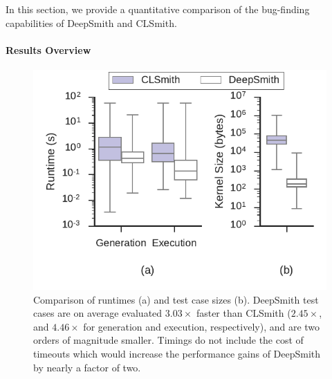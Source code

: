 In this section, we provide a quantitative comparison of the bug-finding capabilities of DeepSmith and CLSmith.

\paragraph{Results Overview}

\begin{table}
  \scriptsize %
  \centering %
  
  \caption{%
    Results from 48 hours of testing using CLSmith and DeepSmith. System \#. as per Table~\ref{tab:platforms}. $\pm$ denotes optimizations off ($-$) vs on ($+$). The remaining columns denote the number of build crash (\bc), build timeout (\bto), anomalous build failure (\abf), anomalous runtime crash (\arc), anomalous wrong-output (\awo), and pass (\textbf{\cmark}) results. 
  }
  \label{tab:megatable}
\end{table}

\begin{figure}
  \centering %
  \includegraphics[width=\columnwidth]{build/img/vs-clsmith}%
  \vspace{-1em}
  \caption{%
    Comparison of runtimes (a) and test case sizes (b). DeepSmith test cases are on average evaluated $3.03\times$ faster than CLSmith ($2.45\times$, and $4.46\times$ for generation and execution, respectively), and are two orders of magnitude smaller. Timings do not include the cost of timeouts which would increase the performance gains of DeepSmith by nearly a factor of two.
  }%
  \label{fig:vs-clsmith} %
\end{figure}

